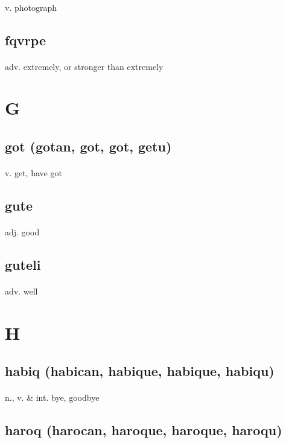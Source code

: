 \documentclass[UTF8]{article}
\begin{document}
    \paragraph{} v. photograph 
    \subsection{fqvrpe}
    \paragraph{} adv. extremely, or stronger than extremely 
    \newpage \section{G}
    \subsection{got (gotan, got, got, getu)}
    \paragraph{} v. get, have got 
    \subsection{gute}
    \paragraph{} adj. good 
    \subsection{guteli}
    \paragraph{} adv. well 
    \newpage \section{H}
    \subsection{habiq (habican, habique, habique, habiqu)}
    \paragraph{} n., v. \& int. bye, goodbye 
    \subsection{haroq (harocan, haroque, haroque, haroqu)}
\end{document}
